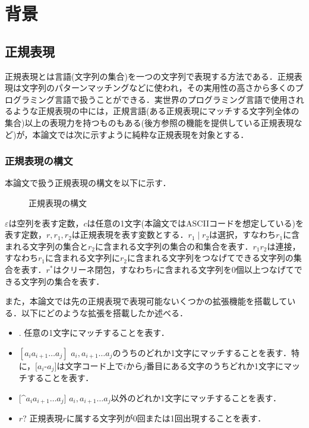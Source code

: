 \documentclass[a4paper, 12pt, dvipdfmx, uplatex]{jsreport}
\begin{document}
\chapter{背景}
\section{正規表現}
正規表現とは言語(文字列の集合)を一つの文字列で表現する方法である．正規表現は文字列のパターンマッチングなどに使われ，その実用性の高さから多くのプログラミング言語で扱うことができる．実世界のプログラミング言語で使用されるような正規表現の中には，正規言語(ある正規表現にマッチする文字列全体の集合)以上の表現力を持つものもある(後方参照の機能を提供している正規表現など)が，本論文では次に示すように純粋な正規表現を対象とする．

\subsection{正規表現の構文}
本論文で扱う正規表現の構文を以下に示す．
\begin{figure}[h]
  \centering
  \setlength{\fboxrule}{0.5pt}
  \caption{正規表現の構文}
  \label{fig:syntax-regex}
\end{figure}

$\varepsilon$は空列を表す定数，$c$は任意の1文字(本論文ではASCIIコードを想定している)を表す定数，$r,r_1,r_2$は正規表現を表す変数とする．$r_1 \mid r_2$は選択，すなわち$r_1$に含まれる文字列の集合と$r_2$に含まれる文字列の集合の和集合を表す．$r_1r_2$は連接，すなわち$r_1$に含まれる文字列に$r_2$に含まれる文字列をつなげてできる文字列の集合を表す．$r^*$はクリーネ閉包，すなわち$r$に含まれる文字列を0個以上つなげてできる文字列の集合を表す．

また，本論文では先の正規表現で表現可能ないくつかの拡張機能を搭載している．以下にどのような拡張を搭載したか述べる．
\begin{itemize}
  \item $.$ \quad 任意の1文字にマッチすることを表す．
  \item $[a_ia_{i+1}\ldots a_j]$ \quad $a_i,a_{i+1}\ldots a_j$のうちのどれか1文字にマッチすることを表す．特に，$[a_i$-$a_j]$は文字コード上で$i$から$j$番目にある文字のうちどれか1文字にマッチすることを表す．
  \item $[$^$a_ia_{i+1}\ldots a_j]$ \quad $a_i,a_{i+1}\ldots a_j$以外のどれか1文字にマッチすることを表す．
  \item $r?$ \quad 正規表現$r$に属する文字列が0回または1回出現することを表す．
\end{itemize}
\end{document}
